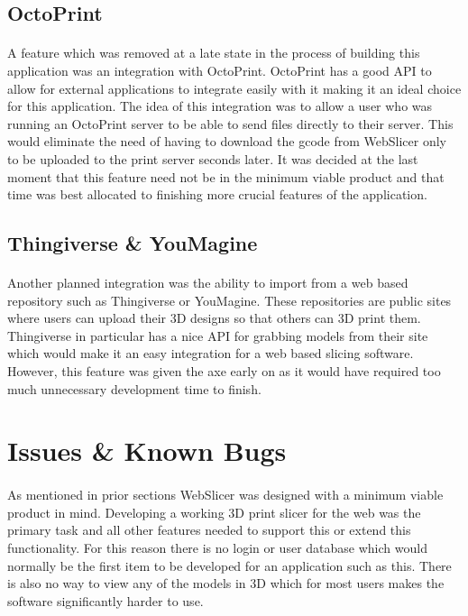 \subsection{OctoPrint}
\paragraph{}
A feature which was removed at a late state in the process of building this application was an integration with OctoPrint.
OctoPrint has a good API to allow for external applications to integrate easily with it making it an ideal choice for this application.
The idea of this integration was to allow a user who was running an OctoPrint server to be able to send files directly to their server.
This would eliminate the need of having to download the gcode from WebSlicer only to be uploaded to the print server seconds later.
It was decided at the last moment that this feature need not be in the minimum viable product and that time was best allocated to finishing more crucial features of the application.

\subsection{Thingiverse \& YouMagine}
\paragraph{}
Another planned integration was the ability to import from a web based repository such as Thingiverse or YouMagine.
These repositories are public sites where users can upload their 3D designs so that others can 3D print them.
Thingiverse in particular has a nice API for grabbing models from their site which would make it an easy integration for a web based slicing software.
However, this feature was given the axe early on as it would have required too much unnecessary development time to finish.

\section{Issues \& Known Bugs}
\paragraph{}
As mentioned in prior sections WebSlicer was designed with a minimum viable product in mind.
Developing a working 3D print slicer for the web was the primary task and all other features needed to support this or extend this functionality.
For this reason there is no login or user database which would normally be the first item to be developed for an application such as this.
There is also no way to view any of the models in 3D which for most users makes the software significantly harder to use.
